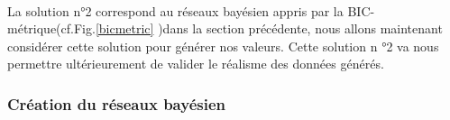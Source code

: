 \documentclass[a4paper]{article}
\begin{document}
\begin{figure}[H]
\centering
{}
$\quad$
\\

\end{figure}

La solution n°2 correspond au réseaux bayésien appris par la BIC-métrique(cf.Fig.\ref{bicmetric} )dans la section précédente, nous allons maintenant considérer cette solution pour générer nos valeurs.
Cette solution n °2 va nous permettre ultérieurement de valider le réalisme des données générés.




\subsubsection{Création du réseaux bayésien}
\end{document}
